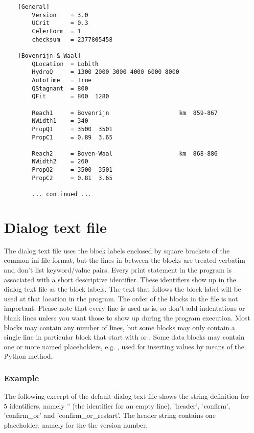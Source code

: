 \begin{Verbatim}
    [General]
        Version    = 3.0
        UCrit      = 0.3
        CelerForm  = 1
        checksum   = 2377805458
    
    [Bovenrijn & Waal]
        QLocation  = Lobith
        HydroQ     = 1300 2000 3000 4000 6000 8000
        AutoTime   = True
        QStagnant  = 800
        QFit       = 800  1280
    
        Reach1     = Bovenrijn                    km  859-867
        NWidth1    = 340
        PropQ1     = 3500  3501
        PropC1     = 0.89  3.65
    
        Reach2     = Boven-Waal                   km  868-886
        NWidth2    = 260
        PropQ2     = 3500  3501
        PropC2     = 0.81  3.65

        ... continued ...
\end{Verbatim}

\section{Dialog text file}

The dialog text file uses the block labels enclosed by square brackets of the common ini-file format, but the lines in between the blocks are treated verbatim and don't list keyword/value pairs.
Every print statement in the program is associated with a short descriptive identifier.
These identifiers show up in the dialog text file as the block labels.
The text that follows the block label will be used at that location in the program.
The order of the blocks in the file is not important.
Please note that every line is used as is, so don't add indentations or blank lines unless you want those to show up during the program execution.
Most blocks may contain any number of lines, but some blocks may only contain a single line in particular block that start with  or .
Some data blocks may contain one or more named placeholders, e.g. , used for inserting values by means of the Python  method.

\subsubsection*{Example}

The following excerpt of the default  dialog text file shows the string definition for 5 identifiers, namely '' (the identifier for an empty line), 'header', 'confirm', 'confirm\_or' and 'confirm\_or\_restart'.
The header string contains one placeholder, namely  for the the version number.

